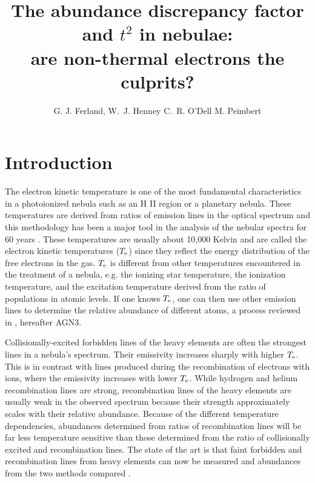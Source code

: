 \documentclass[debug, preprint, twocolumn]{rmaa}
\title{\boldmath The abundance discrepancy factor and \MakeLowercase{$t^2$} in nebulae: \\
are non-thermal electrons the culprits?}
\author{
G. J. Ferland\altaffilmark{1}, 
W.~J. Henney\altaffilmark{2}
C.~R. O'Dell\altaffilmark{3}
M. Peimbert\altaffilmark{4}
}
\begin{document}
\maketitle
\clearpage

\section{Introduction}

The electron kinetic temperature is one of the most fundamental characteristics in a photoionized
nebula such as an H II region or a planetary nebula. 
These temperatures are derived from ratios of emission lines in the optical spectrum 
and this methodology has been  
a major tool in the analysis of the nebular spectra for 60 years
\citep{2002RMxAC..12....1O}.
These temperatures are usually about 10,000 Kelvin and are called the
electron kinetic temperatures ($T\rm_{e}$) since they reflect the energy distribution of the free electrons in the gas.
$T\rm_{e}$ is different from other temperatures encountered in the treatment of a nebula,
e.g. the ionizing star temperature, the ionization temperature, and the excitation temperature 
derived from the ratio of populations in atomic levels.
If one knows $T\rm_{e}$, one can then use other emission lines to determine
the relative abundance of different atoms, a process reviewed in \citet{AGN3}, hereafter AGN3.

Collisionally-excited forbidden lines of the heavy elements are often  the strongest lines in a nebula's spectrum.
Their emissivity increases sharply with higher $T\rm_{e}$. This is in contrast with lines produced during the recombination of electrons with ions, where the emissivity increases with lower $T\rm_{e}$.
While hydrogen and helium recombination lines are strong, 
recombination lines of the heavy elements are usually weak in the observed spectrum because their strength approximately scales with their relative abundance. 
Because of the different temperature dependencies, abundances determined from ratios of
recombination lines will be far less temperature sensitive than those determined from the 
ratio of collisionally excited and recombination lines.
The state of the art is that  faint forbidden and recombination lines from heavy elements can now be measured 
and abundances from the two methods compared
\citep{2003ApJ...584..735P,2004MNRAS.355..229E}.
\end{document}
